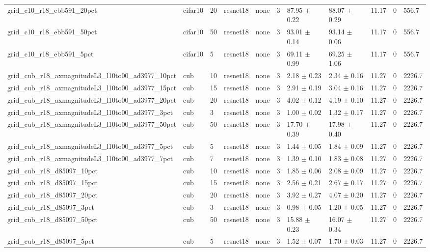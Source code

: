 \begin{tabular}{lllllllllll}
grid_c10_r18_ebb591_20pct & cifar10 & 20 & resnet18 & none & 3 & 87.95 $\pm$ 0.22 & 88.07 $\pm$ 0.29 & 11.17 & 0 & 556.7 \\
grid_c10_r18_ebb591_50pct & cifar10 & 50 & resnet18 & none & 3 & 93.01 $\pm$ 0.14 & 93.14 $\pm$ 0.06 & 11.17 & 0 & 556.7 \\
grid_c10_r18_ebb591_5pct & cifar10 & 5 & resnet18 & none & 3 & 69.11 $\pm$ 0.99 & 69.25 $\pm$ 1.06 & 11.17 & 0 & 556.7 \\
grid_cub_r18_axmagnitudeL3_l10to00_ad3977_10pct & cub & 10 & resnet18 & none & 3 & 2.18 $\pm$ 0.23 & 2.34 $\pm$ 0.16 & 11.27 & 0 & 2226.7 \\
grid_cub_r18_axmagnitudeL3_l10to00_ad3977_15pct & cub & 15 & resnet18 & none & 3 & 2.91 $\pm$ 0.19 & 3.04 $\pm$ 0.16 & 11.27 & 0 & 2226.7 \\
grid_cub_r18_axmagnitudeL3_l10to00_ad3977_20pct & cub & 20 & resnet18 & none & 3 & 4.02 $\pm$ 0.12 & 4.19 $\pm$ 0.10 & 11.27 & 0 & 2226.7 \\
grid_cub_r18_axmagnitudeL3_l10to00_ad3977_3pct & cub & 3 & resnet18 & none & 3 & 1.00 $\pm$ 0.02 & 1.32 $\pm$ 0.17 & 11.27 & 0 & 2226.7 \\
grid_cub_r18_axmagnitudeL3_l10to00_ad3977_50pct & cub & 50 & resnet18 & none & 3 & 17.70 $\pm$ 0.39 & 17.98 $\pm$ 0.40 & 11.27 & 0 & 2226.7 \\
grid_cub_r18_axmagnitudeL3_l10to00_ad3977_5pct & cub & 5 & resnet18 & none & 3 & 1.44 $\pm$ 0.05 & 1.84 $\pm$ 0.09 & 11.27 & 0 & 2226.7 \\
grid_cub_r18_axmagnitudeL3_l10to00_ad3977_7pct & cub & 7 & resnet18 & none & 3 & 1.39 $\pm$ 0.10 & 1.83 $\pm$ 0.08 & 11.27 & 0 & 2226.7 \\
grid_cub_r18_d85097_10pct & cub & 10 & resnet18 & none & 3 & 1.85 $\pm$ 0.06 & 2.08 $\pm$ 0.09 & 11.27 & 0 & 2226.7 \\
grid_cub_r18_d85097_15pct & cub & 15 & resnet18 & none & 3 & 2.56 $\pm$ 0.21 & 2.67 $\pm$ 0.17 & 11.27 & 0 & 2226.7 \\
grid_cub_r18_d85097_20pct & cub & 20 & resnet18 & none & 3 & 3.92 $\pm$ 0.27 & 4.07 $\pm$ 0.20 & 11.27 & 0 & 2226.7 \\
grid_cub_r18_d85097_3pct & cub & 3 & resnet18 & none & 3 & 0.98 $\pm$ 0.05 & 1.20 $\pm$ 0.05 & 11.27 & 0 & 2226.7 \\
grid_cub_r18_d85097_50pct & cub & 50 & resnet18 & none & 3 & 15.88 $\pm$ 0.23 & 16.07 $\pm$ 0.34 & 11.27 & 0 & 2226.7 \\
grid_cub_r18_d85097_5pct & cub & 5 & resnet18 & none & 3 & 1.52 $\pm$ 0.07 & 1.70 $\pm$ 0.03 & 11.27 & 0 & 2226.7 \\

\end{tabular}
